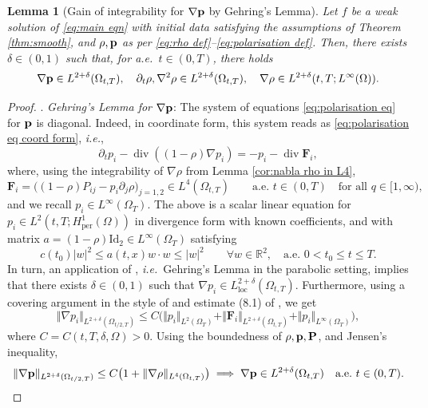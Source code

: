 \documentclass[11pt,a4paper,reqno]{amsart}
\newtheorem{lemma}[prop]{Lemma}
\theoremstyle{remark}
\theoremstyle{definition}
\numberwithin{equation}{section}
\newcommand{\per}{\mathrm{per}}
\DeclareMathOperator{\dv}{div}
\renewcommand{\P}{{\bf P}}
\newcommand{\p}{{\bf p}}
\newcommand{\bF}{\mathbf{F}}
\newcommand{\loc}{\mathrm{loc}}
\begin{document}
\begin{lemma}[Gain of integrability for $\nabla \p$ by Gehring's Lemma]\label{cor:gehring grad p}
Let $f$ be a weak solution of \eqref{eq:main eqn} with initial data satisfying the assumptions of Theorem \ref{thm:smooth}, and $\rho,\p$ as per \eqref{eq:rho def}--\eqref{eq:polarisation def}. Then, there exists $\delta \in (0,1)$ such that, for a.e.~$t \in (0,T)$, there holds 
    \begin{equation*}
        \nabla \p \in L^{2+\delta}(\Omega_{t,T}), \quad \partial_t \rho , \nabla^2 \rho \in L^{2+\delta}(\Omega_{t,T}), \quad \nabla \rho \in L^{2+\delta}(t,T;L^\infty(\Omega)). 
    \end{equation*}
\end{lemma}
\begin{proof}
. \textit{Gehring's Lemma for $\nabla \p$}: The system of equations \eqref{eq:polarisation eq} for $\p$ is diagonal. Indeed, in coordinate form, this system reads as \eqref{eq:polarisation eq coord form}, \textit{i.e.}, 
    \begin{equation}\label{eq:polarisation eq coord form galerkin}
    \partial_t p_i  - \dv((1-\rho)\nabla p_i) = - p_i - \dv \bF_i, 
\end{equation}
where, using the integrability of $\nabla \rho$ from Lemma \ref{cor:nabla rho in L4}, 
\begin{equation*}
    \bF_i = \big((1-\rho)P_{ij}-  p_i \partial_j \rho \big)_{j=1,2} \in L^4(\Omega_{t,T}) \qquad \text{a.e.~}t\in(0,T) \quad \text{for all } q \in [1,\infty), 
\end{equation*}
and we recall $p_i \in L^\infty(\Omega_T)$. The above is a scalar linear equation for $p_i \in L^2(t,T;H^1_\per(\Omega))$ in divergence form with known coefficients, and with matrix $a = (1-\rho)\mathrm{Id}_2 \in L^\infty(\Omega_T)$ satisfying 
\begin{equation*}
    c(t_0)|w|^2 \leq a(t,x) w\cdot w \leq |w|^2 \qquad \forall w \in \mathbb{R}^2, \quad \text{a.e.~}0<t_0 \leq t \leq T. 
\end{equation*}
In turn, an application of \cite[Theorem 8.1]{AuscherGehring}, \textit{i.e.}~Gehring's Lemma in the parabolic setting, implies that there exists $\delta \in (0,1)$ such that $\nabla p_i \in L^{2+\delta}_{\loc}(\Omega_{t,T})$. Furthermore, using a covering argument in the style of \cite[\S 3.1.3]{reg1} and estimate (8.1) of \cite[Theorem 8.1]{AuscherGehring}, we get 
    \begin{equation*}
        \Vert \nabla p_i \Vert_{L^{2+\delta}(\Omega_{t/2,T})} \leq C \Big( \Vert p_i \Vert_{L^2(\Omega_{T})} + \Vert \bF_i \Vert_{L^{2+\delta}(\Omega_{t,T})} + \Vert p_i \Vert_{L^\infty(\Omega_T)} \Big), 
    \end{equation*}
   where $C=C(t,T,\delta,\Omega)>0$. Using the boundedness of $\rho,\p,\P$, and Jensen's inequality, 
        \begin{equation*}
        \Vert \nabla \p \Vert_{L^{2+\delta}(\Omega_{t/2,T})} \leq C \big( 1+ \Vert \nabla \rho \Vert_{L^{4}(\Omega_{t,T})}\big) \implies \nabla \p \in L^{2+\delta}(\Omega_{t,T}) \quad \text{a.e.~} t \in (0,T). 
    \end{equation*}
   

\end{proof}
\end{document}
